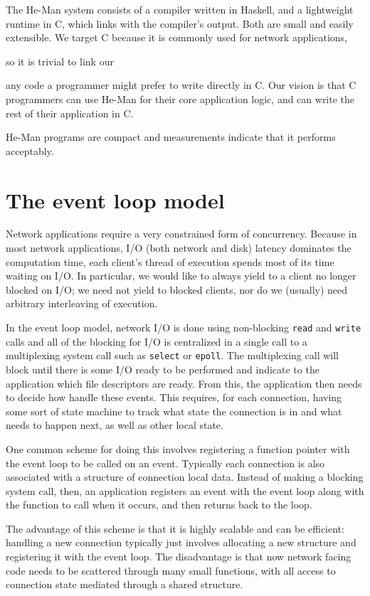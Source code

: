 \documentclass[preprint]{sigplanconf}
\renewcommand{\t}{\texttt}
\begin{document}

The He-Man system consists of a compiler written in Haskell, and a lightweight
runtime in C, which links with the compiler's output. Both are small and easily
extensible. We target C because it is commonly used for network applications,

so it is trivial to link our 

any code a programmer might prefer to write directly in C. 
Our vision is that C programmers can use He-Man for their
core application logic, and can write the rest of their application in C. 

He-Man programs are compact and measurements indicate that it performs
acceptably. 

\section{The event loop model}
Network applications require a very constrained form of
concurrency. Because in most network applications, I/O (both network
and disk) latency dominates the computation time, each client's thread
of execution spends most of its time waiting on I/O. In particular, we
would like to always yield to a client no longer blocked on I/O; we
need not yield to blocked clients, nor do we (usually) need arbitrary
interleaving of execution.

In the event loop model, network I/O is done using non-blocking
\t{read} and \t{write} calls and all of the blocking for I/O is
centralized in a single call to a multiplexing system call such as
\t{select} or \t{epoll}. The multiplexing call will block until there
is some I/O ready to be performed and indicate to the application
which file descriptors are ready. From this, the application then
needs to decide how handle these events. This requires, for each
connection, having some sort of state machine to track what state the
connection is in and what needs to happen next, as well as other local
state.

One common scheme for doing this involves registering a function
pointer with the event loop to be called on an event. Typically each
connection is also associated with a structure of connection local
data. Instead of making a blocking system call, then, an application
registers an event with the event loop along with the function to call
when it occurs, and then returns back to the loop.

The advantage of this scheme is that it is highly scalable and can be
efficient: handling a new connection typically just involves
allocating a new structure and registering it with the event loop. The
disadvantage is that now network facing code needs to be scattered
through many small functions, with all access to connection state
mediated through a shared structure.
\end{document}
